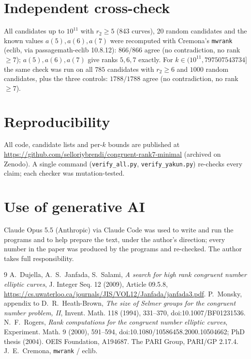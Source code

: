 \documentclass[11pt]{amsart}
\theoremstyle{remark}\newtheorem{remark}[theorem]{Remark}
\begin{document}
\section{Independent cross-check}
All candidates up to $10^{11}$ with $r_2\ge5$ (843 curves), 20 random candidates and the known values $a(5),a(6),a(7)$ were
recomputed with Cremona's \texttt{mwrank} (eclib, via passagemath-eclib 10.8.12): 866/866 agree (no contradiction, no rank $\ge7$);
$a(5),a(6),a(7)$ give ranks $5,6,7$ exactly. For $k\in(10^{11},797507543734]$ the same check was run on all $785$ candidates with $r_2\ge6$
and $1000$ random candidates, plus the three controls: $1788/1788$ agree (no contradiction, no rank $\ge7$).

\section{Reproducibility}
All code, candidate lists and per-$k$ bounds are published at \url{https://github.com/selloriybrendi/congruent-rank7-minimal} (archived on Zenodo). A single command
(\texttt{verify\_all.py}, \texttt{verify\_yakun.py}) re-checks every claim; each checker was mutation-tested.

\section*{Use of generative AI}
Claude Opus 5.5 (Anthropic) via Claude Code was used to write and run the programs and to help prepare the text, under the
author's direction; every number in the paper was produced by the programs and re-checked. The author takes full responsibility.

\begin{thebibliography}{9}
 A.~Dujella, A.~S.~Janfada, S.~Salami, \emph{A search for high rank congruent number elliptic curves}, J. Integer Seq. 12 (2009), Article 09.5.8, \url{https://cs.uwaterloo.ca/journals/JIS/VOL12/Janfada/janfada3.pdf}.
 P.~Monsky, appendix to D.~R.~Heath-Brown, \emph{The size of Selmer groups for the congruent number problem, II}, Invent. Math. 118 (1994), 331--370, doi:10.1007/BF01231536.
 N.~F.~Rogers, \emph{Rank computations for the congruent number elliptic curves}, Experiment. Math. 9 (2000), 591--594, doi:10.1080/10586458.2000.10504662; PhD thesis (2004).
 OEIS Foundation, A194687.
 The PARI Group, PARI/GP 2.17.4.
 J.~E.~Cremona, \texttt{mwrank} / eclib.
\end{thebibliography}
\end{document}
